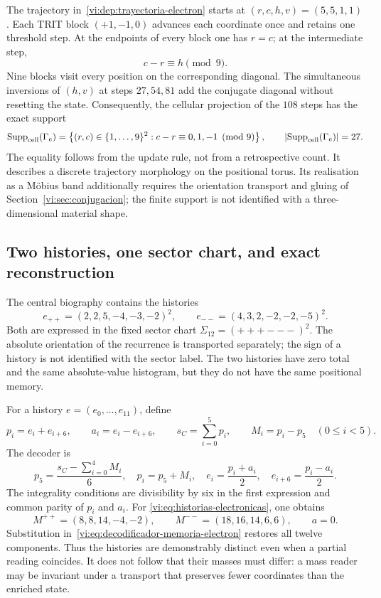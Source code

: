 The trajectory in~\eqref{vi:dep:trayectoria-electron} starts at
$(r,c,h,v)=(5,5,1,1)$. Each TRIT block $(+1,-1,0)$ advances each coordinate
once and retains one threshold step. At the endpoints of every block one has
$r=c$; at the intermediate step,
\[
 c-r\equiv h\pmod 9.
\]
Nine blocks visit every position on the corresponding diagonal. The
simultaneous inversions of $(h,v)$ at steps $27,54,81$ add the conjugate
diagonal without resetting the state. Consequently, the cellular projection
of the $108$ steps has the exact support
\begin{equation}
 \operatorname{Supp}_{\rm cell}(\Gamma_e)
 =\left\{(r,c)\in\{1,\ldots,9\}^2:
 c-r\equiv0,1,-1\pmod9\right\},
 \qquad
 \left|\operatorname{Supp}_{\rm cell}(\Gamma_e)\right|=27.
 \label{vi:eq:soporte-electron-27}
\end{equation}
The equality follows from the update rule, not from a retrospective count.
It describes a discrete trajectory morphology on the positional torus. Its
realisation as a M\"obius band additionally requires the orientation transport
and gluing of Section~\ref{vi:sec:conjugacion}; the finite support is not
identified with a three-dimensional material shape.

\subsection{Two histories, one sector chart, and exact reconstruction}

The central biography contains the histories
\begin{equation}
 e_{++}=(2,2,5,-4,-3,-2)^2,
 \qquad
 e_{--}=(4,3,2,-2,-2,-5)^2.
 \label{vi:eq:historias-electronicas}
\end{equation}
Both are expressed in the fixed sector chart
$\Sigma_{12}=(+++---)^2$. The absolute orientation of the recurrence is
transported separately; the sign of a history is not identified with the
sector label. The two histories have zero total and the same absolute-value
histogram, but they do not have the same positional memory.

For a history $e=(e_0,\ldots,e_{11})$, define
\begin{equation}
 p_i=e_i+e_{i+6},\qquad a_i=e_i-e_{i+6},
 \qquad s_C=\sum_{i=0}^{5}p_i,
 \qquad M_i=p_i-p_5\quad(0\leq i<5).
 \label{vi:eq:codificador-memoria-electron}
\end{equation}
The decoder is
\begin{equation}
 p_5=\frac{s_C-\sum_{i=0}^{4}M_i}{6},\quad
 p_i=p_5+M_i,\quad
 e_i=\frac{p_i+a_i}{2},\quad e_{i+6}=\frac{p_i-a_i}{2}.
 \label{vi:eq:decodificador-memoria-electron}
\end{equation}
The integrality conditions are divisibility by six in the first expression
and common parity of $p_i$ and $a_i$. For
\eqref{vi:eq:historias-electronicas}, one obtains
\[
 M^{++}=(8,8,14,-4,-2),\qquad
 M^{--}=(18,16,14,6,6),\qquad a=0.
\]
Substitution in~\eqref{vi:eq:decodificador-memoria-electron} restores all twelve
components. Thus the histories are demonstrably distinct even when a partial
reading coincides. It does not follow that their masses must differ: a mass
reader may be invariant under a transport that preserves fewer coordinates
than the enriched state.

